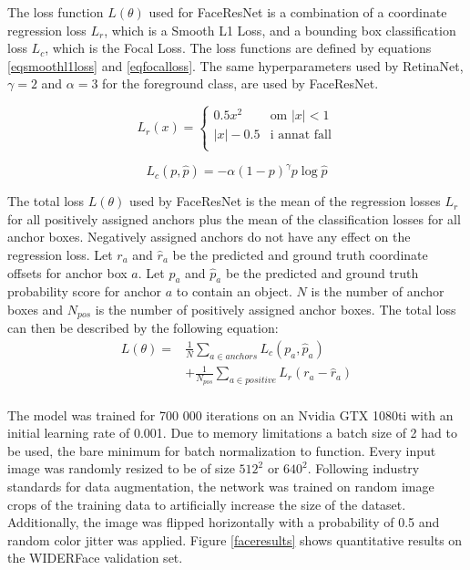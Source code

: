 \documentclass[a4paper,11pt,twoside]{article}
\begin{document}
The loss function $L(\theta)$ used for FaceResNet is a combination of a coordinate regression loss $L_r$, which is a Smooth L1 Loss, and a bounding box classification loss $L_c$, which is the Focal Loss. The loss functions are defined by equations \eqref{eqsmoothl1loss} and \eqref{eqfocalloss}. The same hyperparameters used by RetinaNet, $\gamma=2$ and $\alpha = 3$ for the foreground class, are used by FaceResNet. \cite{retinanet}

\begin{equation}\label{eqfocalloss}
L_r(x) = \begin{cases}
				0.5x^2 & \mbox{om } |x| < 1\\
				|x| - 0.5 & \mbox{i annat fall}\\
			\end{cases}
\end{equation}

\begin{equation}\label{eqsmoothl1loss}
L_c(p, \hat{p}) = - \alpha (1-p)^{\gamma}p \log{\hat{p}}
\end{equation}

The total loss $L(\theta)$ used by FaceResNet is the mean of the regression losses $L_r$ for all positively assigned anchors plus the mean of the classification losses for all anchor boxes. Negatively assigned anchors do not have any effect on the regression loss. Let $r_a$ and $\hat{r}_a$ be the predicted and ground truth coordinate offsets for anchor box $a$. Let $p_a$ and $\hat{p}_a$ be the predicted and ground truth probability score for anchor $a$ to contain an object. $N$ is the number of anchor boxes and $N_{pos}$ is the number of positively assigned anchor boxes. The total loss can then be described by the following equation:
\begin{equation}
\begin{split}
	L(\theta) = &  \frac{1}{N} \sum_{a \in anchors} L_c(p_a, \hat{p}_a) \\
	& + \frac{1}{N_{pos}} \sum_{a \in positive} L_r(r_a - \hat{r}_a)  \\ 
\end{split}
\end{equation}

The model was trained for 700 000 iterations on an Nvidia GTX 1080ti with an initial learning rate of 0.001. Due to memory limitations a batch size of 2 had to be used, the bare minimum for batch normalization to function. Every input image was randomly resized to be of size $512^2$ or $640^2$. Following industry standards for data augmentation, the network was trained on random image crops of the training data to artificially increase the size of the dataset. Additionally, the image was flipped horizontally with a probability of 0.5 and random color jitter was applied. Figure \ref{faceresults} shows quantitative results on the WIDERFace validation set.
\end{document}
